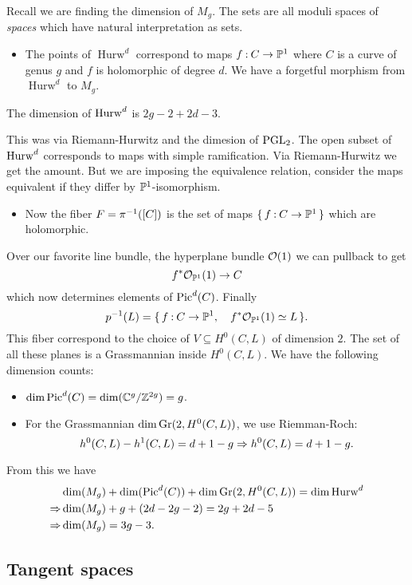 \documentclass[12pt]{memoir}
\begin{document}
Recall we are finding the dimension of $M_g$. The sets are all moduli spaces of \emph{spaces} which have natural interpretation as sets.
\begin{itemize}
    \item The points of $\operatorname{Hurw}^d$ correspond to maps $f\mathbin{:}C\to\mathbb{P}^1$ where $C$ is a curve of genus $g$ and $f$ is holomorphic of degree $d$. We have a forgetful morphism from $\operatorname{Hurw}^d$ to $M_g$.
\end{itemize}
\begin{Prop}
    The dimension of $\operatorname{Hurw}^d$ is $2g-2+2d-3$.
\end{Prop}
This was via Riemann-Hurwitz and the dimesion of $\operatorname{PGL}_2$. The open subset of $\operatorname{Hurw}^d$ corresponds to maps with simple ramification. Via Riemann-Hurwitz we get the amount. But we are imposing the equivalence relation, consider the maps equivalent if they differ by $\mathbb{P}^1$-isomorphism.
\begin{itemize}
    \item Now the fiber $F=\pi^{-1}(\left\lbrack C\right\rbrack)$ is the set of maps $\{\,f\mathbin{:} C\to\mathbb{P}^1\,\}$ which are holomorphic.
\end{itemize}
Over our favorite line bundle, the hyperplane bundle $\mathcal{O}(1)$ we can pullback to get 
$$f^\ast\mathcal{O}_{\mathbb{P}^1}(1)\to C$$
which now determines elements of $\operatorname{Pic}^d(C)$. Finally 
$$p^{-1}(L)=\{\,f\mathbin{:} C\to\mathbb{P}^1,\quad f^\ast\mathcal{O}_{\mathbb{P}^1}(1)\simeq L\,\}.$$
This fiber correspond to the choice of $V\subseteq H^0(C,L)$ of dimension $2$. The set of all these planes is a Grassmannian inside $H^0(C,L)$. We have the following dimension counts:
\begin{itemize}
    \item $\dim\operatorname{Pic}^d(C)=\dim(\mathbb{C}^g/\mathbb{Z}^{2g})=g$.
    \item For the Grassmannian $\dim\operatorname{Gr}(2,H^0(C,L))$, we use Riemman-Roch:
    $$h^0(C,L)-h^1(C,L)=d+1-g\Rightarrow h^0(C,L)=d+1-g.$$
\end{itemize}
From this we have 
\begin{align*}
    &\dim(M_g)+\dim(\operatorname{Pic}^d(C))+\dim\operatorname{Gr}(2,H^0(C,L))=\dim\operatorname{Hurw}^d\\
    \Rightarrow&\dim(M_g)+g+(2d-2g-2)=2g+2d-5\\
    \Rightarrow&\dim(M_g)=3g-3.
\end{align*}

\subsection{Tangent spaces}
\end{document}
